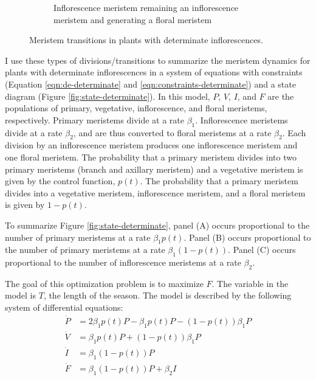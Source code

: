 \documentclass[12pt, oneside]{article}   	%
\begin{document}
\begin{figure}[hbt!]
\begin{subfigure}{.25\textwidth}
    \caption{Inflorescence meristem remaining an inflorescence meristem and generating a floral meristem}
  \end{subfigure}
        \caption{Meristem transitions in plants with determinate inflorescences.}
    \label{fig:transitions-determinate}
\end{figure}

I use these types of divisions/transitions to summarize the meristem dynamics for plants with determinate inflorescences in a system of equations with constraints (Equation \ref{eqn:de-determinate} and \ref{eqn:constraints-determinate}) and a state diagram (Figure \ref{fig:state-determinate}). In this model, $P$, $V$, $I$, and $F$ are the populations of primary, vegetative, inflorescence, and floral meristems, respectively. Primary meristems divide at a rate $\beta_1$. Inflorescence meristems divide at a rate $\beta_2$, and are thus converted to floral meristems at a rate $\beta_2$. Each division by an inflorescence meristem produces one inflorescence meristem and one floral meristem. The probability that a primary meristem divides into two primary meristems (branch and axillary meristem) and a vegetative meristem is given by the control function, $p(t)$. The probability that a primary meristem divides into a vegetative meristem, inflorescence meristem, and a floral meristem is given by $1-p(t)$. 

To summarize Figure \ref{fig:state-determinate}, panel (A) occurs proportional to the number of primary meristems at a rate $\beta_1 p(t)$. Panel (B) occurs proportional to the number of primary meristems at a rate $\beta_1 (1-p(t))$. Panel (C) occurs proportional to the number of inflorescence meristems at a rate $\beta_2$.

The goal of this optimization problem is to maximize $F$. The variable in the model is $T$, the length of the season. The model is described by the following system of differential equations:
%
\begin{align}
\dot{P} & = 2 \beta_1 p(t) P - \beta_1 p(t) P - ( 1-p(t) ) \beta_1 P \nonumber \\
\dot{V} & = \beta_1 p(t) P + ( 1-p(t) ) \beta_1 P \nonumber \\
\dot{I} & = \beta_1 ( 1-p(t) ) P \nonumber \\ %
\dot{F} & = \beta_1 ( 1-p(t) ) P + \beta_2 I
\label{eqn:de-determinate}
\end{align}
\end{document}
